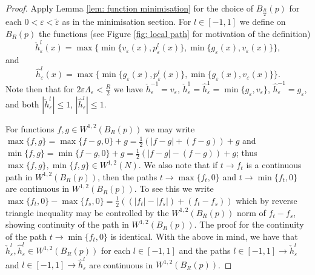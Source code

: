 \documentclass[11pt]{article}
\begin{document}
\begin{proof}
\bigskip

Apply Lemma \ref{lem: function minimisation} for the choice of $B_\frac{R}{2}(p)$ for each $0 < \varepsilon < \tilde{\varepsilon}$ as in the minimisation section. For $l \in [-1,1]$ we define on $B_R(p)$ the functions (see Figure \ref{fig: local path} for motivation of the definition)
\begin{equation*}
    \check{h}^l_\varepsilon(x) = \max\Big\{\min\{v_\varepsilon(x), p^l_\varepsilon(x)\},  \min\{g_\varepsilon(x),v_\varepsilon(x)\} \Big\},
\end{equation*}
and 
\begin{equation*}
    \hat{h}^l_\varepsilon(x) = \max\Big\{\min\{g_\varepsilon(x), p^l_\varepsilon(x)\}, \min\{g_\varepsilon(x),v_\varepsilon(x)\} \Big\}.
\end{equation*}
Note then that for $2\varepsilon\Lambda_\varepsilon < \frac{R}{2}$ we have $\check{h}^{-1}_\varepsilon = v_\varepsilon$, $\check{h}^1_\varepsilon = \hat{h}^1_\varepsilon = \min\{g_\varepsilon,v_\varepsilon\}$, $\hat{h}^{-1}_\varepsilon = g_\varepsilon$, and both $|\check{h}^l_\varepsilon| \leq 1$, $|\hat{h}^l_\varepsilon| \leq 1$.

\bigskip

For functions $f,g \in W^{1,2}(B_R(p))$ we may write $\max \{f,g\} = \max\{f - g, 0\} + g = \frac{1}{2}(|f-g| +(f-g)) + g$ and $\min \{f,g\} = \min\{f - g, 0\} + g = \frac{1}{2}(|f-g| - (f-g)) + g$; thus $\max \{f,g\}, \min \{f,g\} \in W^{1,2}(N)$. We also note that if $t \rightarrow f_t$ is a continuous path in $W^{1,2}(B_R(p))$, then the paths $t \rightarrow \max\{f_t,0\}$ and $t \rightarrow \min\{f_t,0\}$ are continuous in $W^{1,2}(B_R(p))$. To see this we write $\max\{f_t,0\} - \max\{f_s,0\} = \frac{1}{2}((|f_t|-|f_s|) + (f_t - f_s))$ which by reverse triangle inequality may be controlled by the $W^{1,2}(B_R(p))$ norm of $f_t - f_s$, showing continuity of the path in $W^{1,2}(B_R(p))$. The proof for the continuity of the path $t \rightarrow \min\{f_t,0\}$ is identical. With the above in mind, we have that $\check{h}_\varepsilon^l, \hat{h}^l_\varepsilon \in W^{1,2}(B_R(p))$ for each $l \in [-1,1]$ and the paths $l \in [-1,1] \rightarrow \check{h}^l_\varepsilon$ and $l \in [-1,1] \rightarrow \hat{h}^l_\varepsilon$ are continuous in $W^{1,2}(B_R(p))$.

\bigskip


\end{proof}
\end{document}
